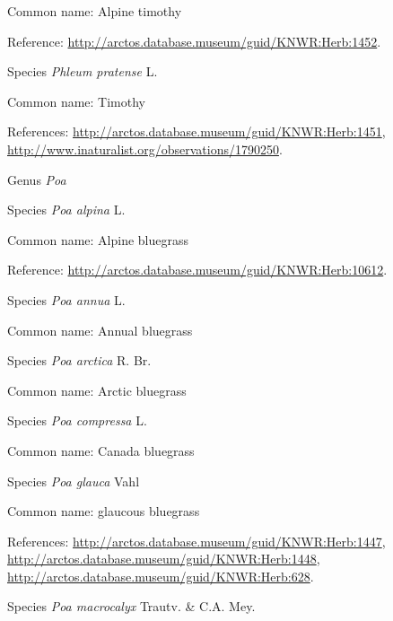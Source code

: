 \documentclass[9pt, article]{memoir}
\begin{document}
\begin{multicols}{2}
Common name: Alpine timothy

Reference: 
\url{http://arctos.database.museum/guid/KNWR:Herb:1452}.

\vspace{6pt}\noindent\hspace{36pt}Species \textit{Phleum pratense} L.


Common name: Timothy

References: 
\url{http://arctos.database.museum/guid/KNWR:Herb:1451}, 
\url{http://www.inaturalist.org/observations/1790250}.

\vspace{6pt}\noindent\hspace{30pt}Genus \textit{Poa}


\vspace{6pt}\noindent\hspace{36pt}Species \textit{Poa alpina} L.


Common name: Alpine bluegrass

Reference: 
\url{http://arctos.database.museum/guid/KNWR:Herb:10612}.

\vspace{6pt}\noindent\hspace{36pt}Species \textit{Poa annua} L.


Common name: Annual bluegrass

\vspace{6pt}\noindent\hspace{36pt}Species \textit{Poa arctica} R. Br.


Common name: Arctic bluegrass

\vspace{6pt}\noindent\hspace{36pt}Species \textit{Poa compressa} L.


Common name: Canada bluegrass

\vspace{6pt}\noindent\hspace{36pt}Species \textit{Poa glauca} Vahl


Common name: glaucous bluegrass

References: 
\url{http://arctos.database.museum/guid/KNWR:Herb:1447}, 
\url{http://arctos.database.museum/guid/KNWR:Herb:1448}, 
\url{http://arctos.database.museum/guid/KNWR:Herb:628}.

\vspace{6pt}\noindent\hspace{36pt}Species \textit{Poa macrocalyx} Trautv. \& C.A. Mey.



\end{multicols}
\end{document}
